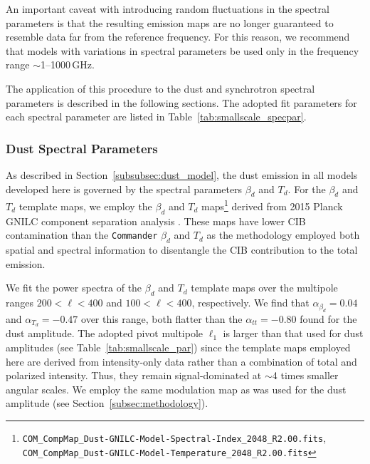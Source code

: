 \documentclass[twocolumn]{aastex631}
\begin{document}
An important caveat with introducing random fluctuations in the spectral parameters is that the resulting emission maps are no longer guaranteed to resemble data far from the reference frequency. For this reason, we recommend that models with variations in spectral parameters be used only in the frequency range $\sim$1--1000\,GHz.

The application of this procedure to the dust and synchrotron spectral parameters is described in the following sections. The adopted fit parameters for each spectral parameter are listed in Table~\ref{tab:smallscale_specpar}.

\subsubsection{Dust Spectral Parameters}\label{subsec:dust_spec_params}
As described in Section~\ref{subsubsec:dust_model}, the dust emission in all models developed here is governed by the spectral parameters $\beta_d$ and $T_d$. For the $\beta_d$ and $T_d$ template maps, we employ the $\beta_d$ and $T_d$ maps\footnote{\texttt{COM\_CompMap\_Dust-GNILC-Model-Spectral-Index\_2048\_R2.00.fits}, \texttt{COM\_CompMap\_Dust-GNILC-Model-Temperature\_2048\_R2.00.fits}} derived from 2015 Planck GNILC component separation analysis \citep{planck2016-XLVIII}. These maps have lower CIB contamination than the \texttt{Commander} $\beta_d$ and $T_d$ \citep{planck2014-a12} as the methodology employed both spatial and spectral information to disentangle the CIB contribution to the total emission.

We fit the power spectra of the $\beta_d$ and $T_d$ template maps over the multipole ranges $200 < \ell < 400$ and $100 < \ell < 400$, respectively. We find that $\alpha_{\beta_d}= 0.04$ and $\alpha_{T_d} = -0.47$ over this range, both flatter than the $\alpha_{tt} = -0.80$ found for the dust amplitude. The adopted pivot multipole $\ell_1$ is larger than that used for dust amplitudes (see Table~\ref{tab:smallscale_par}) since the template maps employed here are derived from intensity-only data rather than a combination of total and polarized intensity. Thus, they remain signal-dominated at $\sim$4 times smaller angular scales. We employ the same modulation map as was used for the dust amplitude (see Section~\ref{subsec:methodology}).
\end{document}
